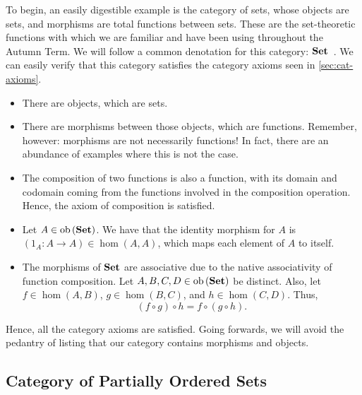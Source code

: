 To begin, an easily digestible example is the category of sets, whose objects
are sets, and morphisms are total functions between sets. These are the
set-theoretic functions with which we are familiar and have been using
throughout the Autumn Term.  We will follow a common denotation for this
category: $\operatorname{\mathbf{Set}}$~\autocite{Leinster:2014}. We can easily verify that this
category satisfies the category axioms seen in \autoref{sec:cat-axioms}.
\begin{itemize}
        \item There are objects, which are sets.
        \item There are morphisms between those objects, which are functions.
                Remember, however: morphisms are not necessarily functions! In
                fact, there are an abundance of examples where this is not the
                case.
        \item The composition of two functions is also a function, with its
                domain and codomain coming from the functions involved in the
                composition operation. Hence, the axiom of composition is
                satisfied.
        \item Let $A \in \operatorname{ob}{(\operatorname{\mathbf{Set}})}$. We have that the identity
                morphism for $A$ is $(1_A \colon A \to A) \in \hom (A, A)$,
                which maps each element of $A$ to itself.
        \item The morphisms of $\operatorname{\mathbf{Set}}$ are associative due to the
                native associativity of function composition. Let $A, B, C, D
                \in \operatorname{ob}{(\operatorname{\mathbf{Set}})}$ be distinct. Also, let $f \in \hom (A,
                B)$, $g \in \hom (B, C)$, and $h \in \hom (C, D)$. Thus,
                \begin{equation}
                        ( f \circ g ) \circ h = f \circ ( g \circ h ).
                \end{equation}
\end{itemize}

Hence, all the category axioms are satisfied. Going forwards, we will avoid the
pedantry of listing that our category contains morphisms and objects.

\subsection{Category of Partially Ordered Sets}

